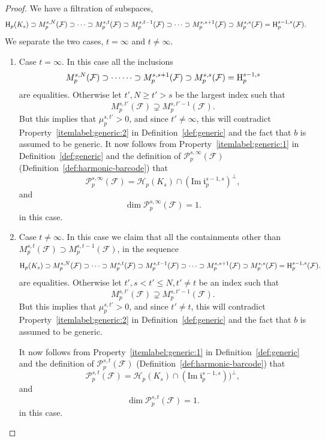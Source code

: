 \documentclass[11pt]{amsart}
\theoremstyle{theorem}
\theoremstyle{remark}
\theoremstyle{definition}
\newcommand{\HH}  {\mbox{\rm H}}
\begin{document}
\begin{proof}
We have a filtration of subspaces, 
\[
\HH_p(K_s) \supset M^{s,N}_p(\mathcal{F}) \supset \cdots  \supset M^{s,t}_p(\mathcal{F})  \supset M^{s,t-1}_p(\mathcal{F}) \supset \cdots \supset 
M^{s,s+1}_p(\mathcal{F}) \supset M^{s,s}_p(\mathcal{F}) = \HH_p^{s-1,s}(\mathcal{F}).
\]
We separate the two cases, $t = \infty$ and $t \neq \infty$.
\begin{enumerate}
    \item 
    \label{itemlabel:proof:prop:simplified:1}
    Case $t = \infty$. In this case all the inclusions 
    \[
    M^{s,N}_p(\mathcal{F}) \supset \cdots  
    \cdots \supset 
M^{s,s+1}_p(\mathcal{F}) \supset M^{s,s}_p(\mathcal{F}) = \HH_p^{s-1,s}
    \]
    are equalities. Otherwise let $t', N \geq t' > s$ be the largest index such that 
    \[
    M^{s,t'}_p(\mathcal{F})  \supsetneq  M^{s,t'-1}_p(\mathcal{F}).
    \]
    But this implies that $\mu_p^{s,t'} > 0$, and since $t' \neq \infty$,
    this will contradict 
    Property~\eqref{itemlabel:generic:2} in Definition~\ref{def:generic} 
    and the fact that $b$ is assumed to be generic.
    It now follows from Property~\eqref{itemlabel:generic:1} in Definition~\ref{def:generic} and the definition of
    $\mathcal{P}_p^{s,\infty}(\mathcal{F})$ (Definition~\ref{def:harmonic-barcode})  that
    \[
    \mathcal{P}_p^{s,\infty}(\mathcal{F}) = \mathcal{H}_p(K_s) \cap (\mathrm{Im} \; \mathfrak{i}_p^{s-1,s})^\perp,
    \]
and 
\[
\dim \mathcal{P}_p^{s,\infty}(\mathcal{F}) = 1.
\]
    in this case.
    \item 
     \label{itemlabel:proof:prop:simplified:2}
    Case $t \neq \infty$. In this case we claim that 
    all the containments other than $M^{s,t}_p(\mathcal{F})  \supset M^{s,t-1}_p(\mathcal{F})$, in the sequence
    \[
\HH_p(K_s) \supset M^{s,N}_p(\mathcal{F}) \supset \cdots  \supset M^{s,t}_p(\mathcal{F})  \supset M^{s,t-1}_p(\mathcal{F}) \supset \cdots \supset 
M^{s,s+1}_p(\mathcal{F}) \supset M^{s,s}_p(\mathcal{F}) = \HH_p^{s-1,s}(\mathcal{F}).
\]
are equalities.
Otherwise let $t', s < t' \leq N, t' \neq t $ be an index such that 
    \[
    M^{s,t'}_p(\mathcal{F})  \supsetneq  M^{s,t'-1}_p(\mathcal{F}).
    \]
    But this implies that $\mu_p^{s,t'} > 0$, and since $t' \neq t$,
    this will contradict 
    Property~\ref{itemlabel:generic:2} in Definition~\ref{def:generic} 
    and the fact that $b$ is assumed to be generic.

    It now follows from Property~\eqref{itemlabel:generic:1} in Definition~\ref{def:generic} and the definition of
    $\mathcal{P}_p^{s,t}(\mathcal{F})$ (Definition~\ref{def:harmonic-barcode})  that
    \[
    \mathcal{P}_p^{s,t}(\mathcal{F}) = \mathcal{H}_p(K_s) \cap (\mathrm{Im} \; \mathfrak{i}_p^{s-1,s}))^\perp,
    \]
and 
\[
\dim \mathcal{P}_p^{s,t}(\mathcal{F}) = 1.
\]
in this case.
\end{enumerate}



\end{proof}
\end{document}
